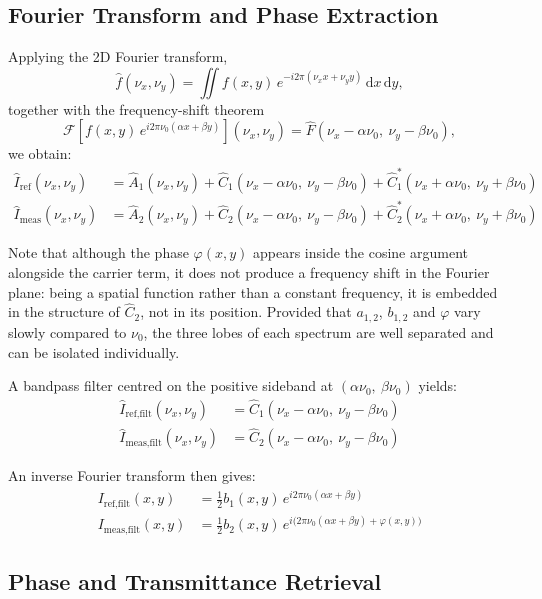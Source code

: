 \documentclass[11pt,a4paper]{article}
\begin{document}
\subsection{Fourier Transform and Phase Extraction}

Applying the 2D Fourier transform,
$$
\hat{f}(\nu_x,\nu_y) = \iint f(x,y)\,e^{-i2\pi(\nu_x x + \nu_y y)}\,\mathrm{d}x\,\mathrm{d}y,
$$
together with the frequency-shift theorem
$$
\mathcal{F}\!\left[f(x,y)\,e^{i2\pi\nu_0(\alpha x+\beta y)}\right](\nu_x,\nu_y) = \hat{F}(\nu_x - \alpha\nu_0,\ \nu_y - \beta\nu_0),
$$
we obtain:
\begin{align}
\hat{I}_{\text{ref}}(\nu_x,\nu_y)  &= \hat{A}_1(\nu_x,\nu_y) + \hat{C}_1(\nu_x - \alpha\nu_0,\ \nu_y - \beta\nu_0) + \hat{C}_1^*(\nu_x + \alpha\nu_0,\ \nu_y + \beta\nu_0) \\
\hat{I}_{\text{meas}}(\nu_x,\nu_y) &= \hat{A}_2(\nu_x,\nu_y) + \hat{C}_2(\nu_x - \alpha\nu_0,\ \nu_y - \beta\nu_0) + \hat{C}_2^*(\nu_x + \alpha\nu_0,\ \nu_y + \beta\nu_0)
\end{align}

Note that although the phase $\varphi(x,y)$ appears inside the cosine argument alongside the carrier term, it does not produce a frequency shift in the Fourier plane: being a spatial function rather than a constant frequency, it is embedded in the structure of $\hat{C}_2$, not in its position. Provided that $a_{1,2}$, $b_{1,2}$ and $\varphi$ vary slowly compared to $\nu_0$, the three lobes of each spectrum are well separated and can be isolated individually.

A bandpass filter centred on the positive sideband at $(\alpha\nu_0,\ \beta\nu_0)$ yields:
\begin{align}
\hat{I}_{\text{ref,filt}}(\nu_x,\nu_y)  &= \hat{C}_1(\nu_x - \alpha\nu_0,\ \nu_y - \beta\nu_0) \\
\hat{I}_{\text{meas,filt}}(\nu_x,\nu_y) &= \hat{C}_2(\nu_x - \alpha\nu_0,\ \nu_y - \beta\nu_0)
\end{align}

An inverse Fourier transform then gives:
\begin{align}
I_{\text{ref,filt}}(x,y)  &= \tfrac{1}{2}b_1(x,y)\,e^{i2\pi\nu_0(\alpha x+\beta y)} \\
I_{\text{meas,filt}}(x,y) &= \tfrac{1}{2}b_2(x,y)\,e^{i\big(2\pi\nu_0(\alpha x+\beta y) + \varphi(x,y)\big)}
\end{align}

\subsection{Phase and Transmittance Retrieval}
\end{document}
